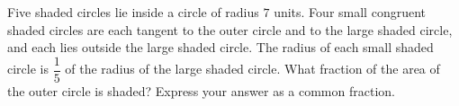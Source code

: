Five shaded circles lie inside a circle of radius $7$ units. Four small congruent shaded circles are each tangent to the outer circle and to the large shaded circle, and each lies outside the large shaded circle. The radius of each small shaded circle is $\dfrac{1}{5}$ of the radius of the large shaded circle. What fraction of the area of the outer circle is shaded? Express your answer as a common fraction.
